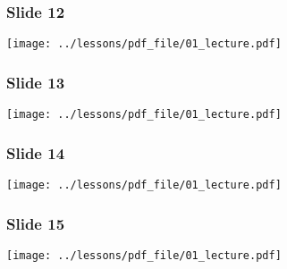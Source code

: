\documentclass[../main/main.tex]{subfiles}
\begin{document}
\subsubsection*{Slide 12}

\begin{minipage}[]{0.5\linewidth}
\centering
\texttt{[image: ../lessons/pdf\_file/01\_lecture.pdf]}
\end{minipage}
\hspace{0.3cm}\vspace{0.3cm}
\begin{minipage}[c]{0.47\linewidth}

\end{minipage}

\subsubsection*{Slide 13}

\begin{minipage}[]{0.5\linewidth}
\centering
\texttt{[image: ../lessons/pdf\_file/01\_lecture.pdf]}
\end{minipage}
\hspace{0.3cm}\vspace{0.3cm}
\begin{minipage}[c]{0.47\linewidth}

\end{minipage}

\subsubsection*{Slide 14}

\begin{minipage}[]{0.5\linewidth}
\centering
\texttt{[image: ../lessons/pdf\_file/01\_lecture.pdf]}
\end{minipage}
\hspace{0.3cm}\vspace{0.3cm}
\begin{minipage}[c]{0.47\linewidth}

\end{minipage}

\subsubsection*{Slide 15}

\begin{minipage}[]{0.5\linewidth}
\centering
\texttt{[image: ../lessons/pdf\_file/01\_lecture.pdf]}
\end{minipage}
\hspace{0.3cm}\vspace{0.3cm}
\begin{minipage}[c]{0.47\linewidth}

\end{minipage}
\end{document}
